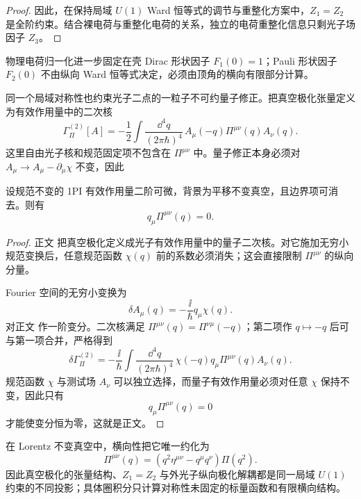 \begin{proof}
因此，在保持局域 $U(1)$ Ward 恒等式的调节与重整化方案中，$Z_1=Z_2$ 是全阶约束。结合裸电荷与重整化电荷的关系，独立的电荷重整化信息只剩光子场因子 $Z_3$。
\end{proof}

物理电荷归一化进一步固定在壳 Dirac 形状因子 $F_1(0)=1$；Pauli 形状因子 $F_2(0)$ 不由纵向 Ward 恒等式决定，必须由顶角的横向有限部分计算。

同一个局域对称性也约束光子二点的一粒子不可约量子修正。把真空极化张量定义为有效作用量中的二次核
\begin{equation}
{
\Gamma_{\Pi}^{(2)}[A]
=-\frac12\int\frac{\dd^4 q}{(2\pi\hbar)^4}\,
A_\mu(-q)\Pi^{\mu\nu}(q)A_\nu(q).}
\label{eq:qed-vacpol-quadratic-kernel-dp68}
\end{equation}
这里自由光子核和规范固定项不包含在 \(\Pi^{\mu\nu}\) 中。量子修正本身必须对 \(A_\mu\to A_\mu-\partial_\mu\chi\) 不变，因此


\begin{proposition}[规范不变二次核的横向性]
设规范不变的 1PI 有效作用量二阶可微，背景为平移不变真空，且边界项可消去。则有
\begin{equation}
{q_\mu\Pi^{\mu\nu}(q)=0.}
\label{eq:qed_vacuum_polarization_transversality_from_1pi}
\end{equation}
\end{proposition}
\begin{proof}
正文 把真空极化定义成光子有效作用量中的量子二次核。对它施加无穷小规范变换后，任意规范函数 \(\chi(q)\) 前的系数必须消失；这会直接限制 \(\Pi^{\mu\nu}\) 的纵向分量。

Fourier 空间的无穷小变换为
\begin{equation*}
\delta A_\mu(q)=-\frac{\ii}{\hbar}q_\mu\chi(q).
\end{equation*}
对正文 作一阶变分。二次核满足 $\Pi^{\mu\nu}(q)=\Pi^{\nu\mu}(-q)$；第二项作 $q\mapsto-q$ 后可与第一项合并，严格得到
\begin{equation*}
\delta\Gamma_{\Pi}^{(2)}
=-\frac{\ii}{\hbar}
\int\frac{\dd^4 q}{(2\pi\hbar)^4}\,
\chi(-q)q_\mu\Pi^{\mu\nu}(q)A_\nu(q).
\end{equation*}
规范函数 \(\chi\) 与测试场 \(A_\nu\) 可以独立选择，而量子有效作用量必须对任意 \(\chi\) 保持不变，因此只有
\begin{equation*}
q_\mu\Pi^{\mu\nu}(q)=0
\end{equation*}
才能使变分恒为零，这就是正文。
\end{proof}

在 Lorentz 不变真空中，横向性把它唯一约化为
\begin{equation}
{
\Pi^{\mu\nu}(q)
=\left(q^2\eta^{\mu\nu}-q^\mu q^\nu\right)\Pi(q^2).}
\label{eq:qed_vacuum_polarization_transverse_decomposition}
\end{equation}
因此真空极化的张量结构、$Z_1=Z_2$ 与外光子纵向极化解耦都是同一局域 $U(1)$ 约束的不同投影；具体圈积分只计算对称性未固定的标量函数和有限横向结构。
